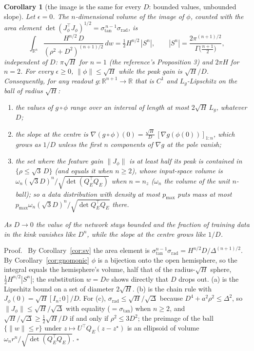 \documentclass[11pt]{article}
\theoremstyle{plainnote}
\newtheorem{corollary}{Corollary}
\renewenvironment{proof}[1][Proof]{\par\noindent #1.\ }{\hfill$\square$\par}
\newcommand{\R}{\mathbb R}
\begin{document}
\begin{corollary}[the image is the same for every $D$: bounded values, unbounded slope]\label{cor:area}
Let $\epsilon=0$. The $n$-dimensional volume of the image of $\phi$, counted with the area element $\det(J_\phi^\top J_\phi)^{1/2}=\sigma_{\mathrm{tan}}^{\,n-1}\sigma_{\mathrm{rad}}$, is
\begin{equation}
\int_{\R^n}\frac{H^{n/2}\,D}{(\rho^2+D^2)^{(n+1)/2}}\,dw=\tfrac12 H^{n/2}\,|S^n|,\qquad |S^n|=\frac{2\pi^{(n+1)/2}}{\Gamma\big(\frac{n+1}{2}\big)},
\label{eq:area}
\end{equation}
independent of $D$: $\pi\sqrt H$ for $n=1$ (the reference's Proposition 3) and $2\pi H$ for $n=2$. For every $\epsilon\ge0$, $\|\phi\|\le\sqrt H$ while the peak gain is $\sqrt H/D$. Consequently, for any readout $g:\R^{n+1}\to\R$ that is $C^1$ and $L_g$-Lipschitz on the ball of radius $\sqrt H$:
\begin{enumerate}
\item[(a)] the values of $g\circ\phi$ range over an interval of length at most $2\sqrt H\,L_g$, whatever $D$;
\item[(b)] the slope at the centre is $\nabla(g\circ\phi)(0)=\frac{\sqrt H}{D}\,[\nabla g(\phi(0))]_{1:n}$, which grows as $1/D$ unless the first $n$ components of $\nabla g$ at the pole vanish;
\item[(c)] the set where the feature gain $\|J_\phi\|$ is at least half its peak is contained in $\{\rho\le\sqrt3\,D\}$ (and equals it when $n\ge2$), whose input-space volume is $\omega_n(\sqrt3D)^n/\sqrt{\det(Q_E^\top Q_E)}$ when $n=n_z$ ($\omega_n$ the volume of the unit $n$-ball); so a data distribution with density at most $p_{\max}$ puts mass at most $p_{\max}\omega_n(\sqrt3D)^n/\sqrt{\det Q_E^\top Q_E}$ there.
\end{enumerate}
As $D\to0$ the value of the network stays bounded and the fraction of training data in the kink vanishes like $D^n$, while the slope at the centre grows like $1/D$.
\end{corollary}

\begin{proof}
By Corollary~\ref{cor:sv} the area element is $\sigma_{\mathrm{tan}}^{n-1}\sigma_{\mathrm{rad}}=H^{n/2}D/\Delta^{(n+1)/2}$. By Corollary~\ref{cor:gnomonic} $\phi$ is a bijection onto the open hemisphere, so the integral equals the hemisphere's volume, half that of the radius-$\sqrt H$ sphere, $\frac12 H^{n/2}|S^n|$; the substitution $w=Dv$ shows directly that $D$ drops out. (a) is the Lipschitz bound on a set of diameter $2\sqrt H$. (b) is the chain rule with $J_\phi(0)=\sqrt H[I_n;0]/D$. For (c), $\sigma_{\mathrm{rad}}\le\sqrt H/\sqrt\Delta$ because $D^4+a^2\rho^2\le\Delta^2$, so $\|J_\phi\|\le\sqrt H/\sqrt\Delta$ with equality ($=\sigma_{\mathrm{tan}}$) when $n\ge2$, and $\sqrt H/\sqrt\Delta\ge\frac12\sqrt H/D$ if and only if $\rho^2\le3D^2$; the preimage of the ball $\{\|w\|\le r\}$ under $z\mapsto U^\top Q_E(z-z^\star)$ is an ellipsoid of volume $\omega_nr^n/\sqrt{\det(Q_E^\top Q_E)}$.
\end{proof}
\end{document}
